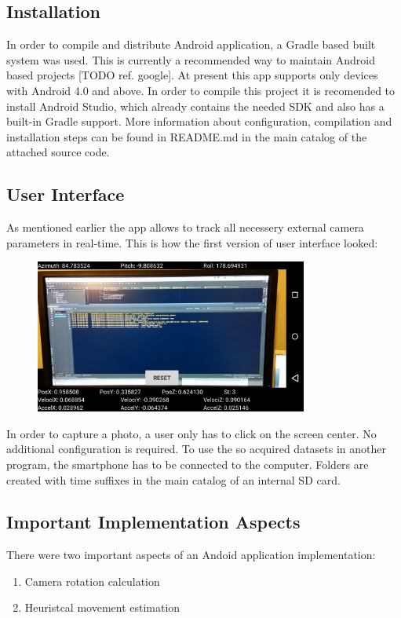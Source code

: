 \subsection{Installation}
In order to compile and distribute Android application, a Gradle based built system was used. This is currently a recommended way to maintain Android based projects [TODO ref. google]. At present this app supports only devices with Android 4.0 and above. In order to compile this project it is recomended to install Android Studio, which already contains the needed SDK and also has a built-in Gradle support. More information about configuration, compilation and installation steps can be found in README.md in the main catalog of the attached source code. 
\subsection{User Interface}
As mentioned earlier the app allows to track all necessery external camera parameters in real-time. This is how the first version of user interface looked:
\begin{figure}[h!]
    \centering
    \includegraphics[width=0.8\textwidth]{AndroidScreenShot}
    \caption{}
    \label{fig:AndroidScreenShot}
\end{figure}
\clearpage
In order to capture a photo, a user only has to click on the screen center. No additional configuration is required. To use the so acquired datasets in another program, the smartphone has to be connected to the computer. Folders are created with time suffixes in the main catalog of an internal SD card.
\subsection{Important Implementation Aspects}
There were two important aspects of an Andoid application implementation:
\begin{enumerate}
\item Camera rotation calculation
\item Heuristcal movement estimation
\end{enumerate}
